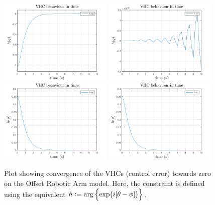 \documentclass[main.tex]{subfiles}
\begin{document}
\begin{figure}[h]
    \centering
    \includegraphics[width=0.48\textwidth]{assets/rao1.png}
    \includegraphics[width=0.48\textwidth]{assets/rao2.png}
    \includegraphics[width=0.48\textwidth]{assets/rao3.png}
    \includegraphics[width=0.48\textwidth]{assets/rao4.png}
    \caption{Plot showing convergence of the VHCs (control error) towards zero on the Offset Robotic Arm model. Here, the constraint is defined using the equivalent $h:=\arg\cbr{\exp(i[\theta-\phi])}$.}
    \label{fig:graph-robotarm}
\end{figure}
\end{document}
